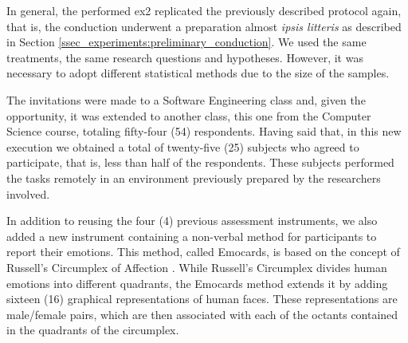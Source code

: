 In general, the performed \ac{ex2} replicated the previously described protocol again, that is, the conduction underwent a preparation almost \textit{ipsis litteris} as described in Section \ref{ssec_experiments:preliminary_conduction}.
We used the same treatments, the same research questions and hypotheses.
However, it was necessary to adopt different statistical methods due to the size of the samples.

The invitations were made to a Software Engineering class and, given the opportunity, it was extended to another class, this one from the Computer Science course, totaling fifty-four (54) respondents.
Having said that, in this new execution we obtained a total of twenty-five (25) subjects who agreed to participate, that is, less than half of the respondents.
These subjects performed the tasks remotely in an environment previously prepared by the researchers involved.

In addition to reusing the four (4) previous assessment instruments, we also added a new instrument containing a non-verbal method for participants to report their emotions.
This method, called Emocards, is based on the concept of Russell's Circumplex of Affection \cite{desmet:2001}.
While Russell's Circumplex divides human emotions into different quadrants, the Emocards method extends it by adding sixteen (16) graphical representations of human faces.
These representations are male/female pairs, which are then associated with each of the octants contained in the quadrants of the circumplex.


